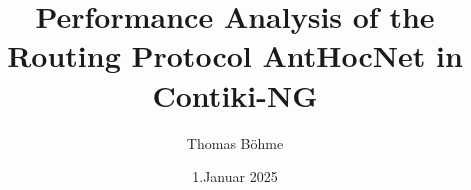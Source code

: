 \def\thetitle{Performance Analysis of the Routing Protocol AntHocNet in Contiki-NG}
\def\theauthor{Thomas Böhme}
\def\thedate{1.\@ Januar 2025}


\title{\thetitle}
\author{\theauthor}
\date{\thedate}
